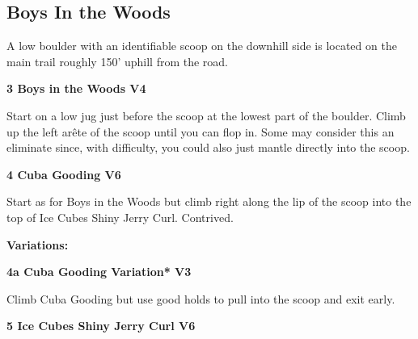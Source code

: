 	\begin{multicols}{2}


\needspace{1.5cm}
\subsection*{Boys In the Woods}\label{bf:Boys In the Woods}
A low boulder with an identifiable scoop on the downhill side is located on the main trail roughly 150' uphill from the road.\\
	


\needspace{1.5cm}
\label{rt:Boys in the Woods}
\colorbox{RoyalBlue!20}{
\parbox{0.95\linewidth}{
\textbf{
3 Boys in the Woods V4  
}}}

\begin{adjustwidth}{0.5cm}{}			
Start on a low jug just before the scoop at the lowest part of the boulder. Climb up the left arête of the scoop until you can flop in. Some may consider this an eliminate since, with difficulty, you could also just mantle directly into the scoop.
\end{adjustwidth}



\needspace{1.5cm}
\label{rt:Cuba Gooding}
\colorbox{RoyalBlue!20}{
\parbox{0.95\linewidth}{
\textbf{
4 Cuba Gooding V6  
}}}

\begin{adjustwidth}{0.5cm}{}			
Start as for Boys in the Woods but climb right along the lip of the scoop into the top of Ice Cubes Shiny Jerry Curl. Contrived.
\end{adjustwidth}

\begin{adjustwidth}{0.5cm}{}				
\needspace{3cm}
\textbf{Variations:} \newline

\needspace{1.5cm}
\label{vr:Cuba Gooding Variation}
\colorbox{green!20}{
\parbox{0.95\linewidth}{
\textbf{
4a Cuba Gooding Variation* V3  
}}}

\begin{adjustwidth}{0.5cm}{}			
Climb Cuba Gooding but use good holds to pull into the scoop and exit early.
\end{adjustwidth}


\end{adjustwidth}


\needspace{1.5cm}
\label{rt:Ice Cubes Shiny Jerry Curl}
\colorbox{RoyalBlue!20}{
\parbox{0.95\linewidth}{
\textbf{
5 Ice Cubes Shiny Jerry Curl V6  
}}}


\end{multicols}

